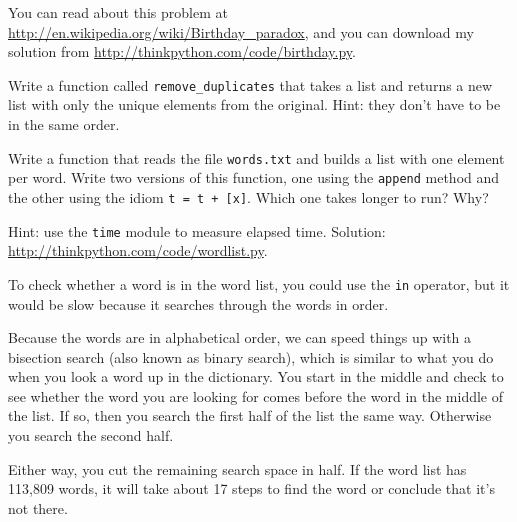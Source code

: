 \documentclass[10pt]{book}
\begin{document}
\begin{CJK}{UTF8}{gbsn}
\begin{exercise}
\begin{enumerate}
\end{enumerate}

You can read about this problem at
\url{http://en.wikipedia.org/wiki/Birthday_paradox}, and you can download my
solution from \url{http://thinkpython.com/code/birthday.py}.

\end{exercise}


\begin{exercise}

Write a function called \verb"remove_duplicates" that takes
a list and returns a new list with only the unique elements from
the original.  Hint: they don't have to be in the same order.
\end{exercise}


\begin{exercise}

Write a function that reads the file {\tt words.txt} and builds
a list with one element per word.  Write two versions of
this function, one using the {\tt append} method and the
other using the idiom {\tt t = t + [x]}.  Which one takes
longer to run?  Why?

Hint: use the {\tt time} module to measure elapsed time.
Solution: \url{http://thinkpython.com/code/wordlist.py}.

\end{exercise}


\begin{exercise}
\label{wordlist1}
\label{bisection}

To check whether a word is in the word list, you could use
the {\tt in} operator, but it would be slow because it searches
through the words in order.

Because the words are in alphabetical order, we can speed things up
with a bisection search (also known as binary search), which is
similar to what you do when you look a word up in the dictionary.  You
start in the middle and check to see whether the word you are looking
for comes before the word in the middle of the list.  If so, then you
search the first half of the list the same way.  Otherwise you search
the second half.

Either way, you cut the remaining search space in half.  If the
word list has 113,809 words, it will take about 17 steps to
find the word or conclude that it's not there.


\end{exercise}
\end{CJK}
\end{document}
